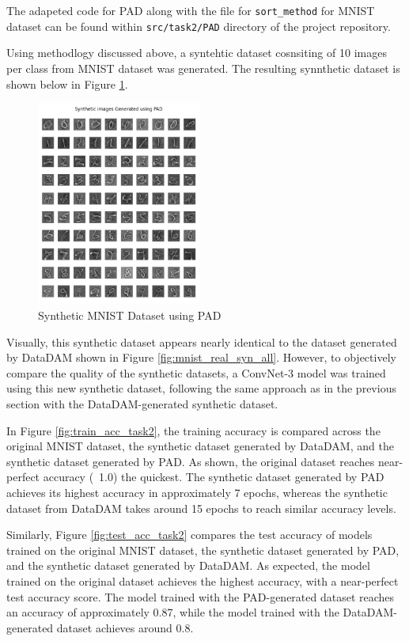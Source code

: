 \documentclass[conference, compsoc]{IEEEtran}
\begin{document}
	The adapeted code for PAD along with the file for \texttt{sort\_method} for MNIST dataset can be found within \texttt{src/task2/PAD} directory of the project repository.
	
	Using methodlogy discussed above, a syntehtic dataset cosnsiting of 10 images per class from MNIST dataset was generated. The resulting synnthetic dataset is shown below in Figure \ref{fig:synthetic_images_task2}.
	
	\begin{figure}[H]
		\centering
		\includegraphics[width=0.48\textwidth]{synthetic_images_task2.png}
		\caption{Synthetic MNIST Dataset using PAD\cite{li2024prioritizealignmentdatasetdistillation}}
		\label{fig:synthetic_images_task2}
	\end{figure}
	Visually, this synthetic dataset appears nearly identical to the dataset generated by DataDAM shown in Figure \ref{fig:mnist_real_syn_all}. However, to objectively compare the quality of the synthetic datasets, a ConvNet-3 model was trained using this new synthetic dataset, following the same approach as in the previous section with the DataDAM-generated synthetic dataset.
	
	In Figure \ref{fig:train_acc_task2}, the training accuracy is compared across the original MNIST dataset, the synthetic dataset generated by DataDAM, and the synthetic dataset generated by PAD. As shown, the original dataset reaches near-perfect accuracy (~1.0) the quickest. The synthetic dataset generated by PAD achieves its highest accuracy in approximately 7 epochs, whereas the synthetic dataset from DataDAM takes around 15 epochs to reach similar accuracy levels.
	
	Similarly, Figure \ref{fig:test_acc_task2} compares the test accuracy of models trained on the original MNIST dataset, the synthetic dataset generated by PAD, and the synthetic dataset generated by DataDAM. As expected, the model trained on the original dataset achieves the highest accuracy, with a near-perfect test accuracy score. The model trained with the PAD-generated dataset reaches an accuracy of approximately 0.87, while the model trained with the DataDAM-generated dataset achieves around 0.8.
	
\end{document}
